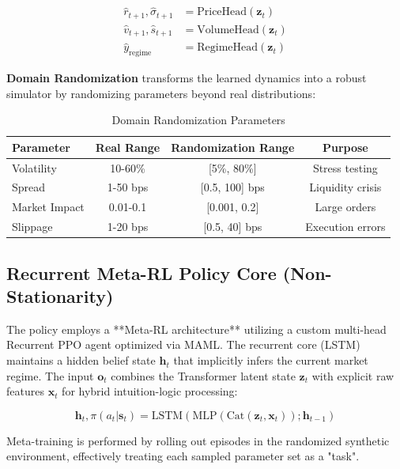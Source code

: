 \documentclass[11pt]{article}
\begin{document}
\begin{align}
    \hat{r}_{t+1}, \hat{\sigma}_{t+1} &= \text{PriceHead}(\mathbf{z}_t) \\
    \hat{v}_{t+1}, \hat{s}_{t+1} &= \text{VolumeHead}(\mathbf{z}_t) \\
    \hat{y}_{\text{regime}} &= \text{RegimeHead}(\mathbf{z}_t)
\end{align}

\textbf{Domain Randomization} transforms the learned dynamics into a robust simulator by randomizing parameters beyond real distributions:

\begin{table}[h]
\centering
\begin{tabular}{@{}lccc@{}}
\toprule
Parameter & Real Range & Randomization Range & Purpose \\
\midrule
Volatility & 10-60\% & [5\%, 80\%] & Stress testing \\
Spread & 1-50 bps & [0.5, 100] bps & Liquidity crisis \\
Market Impact & 0.01-0.1 & [0.001, 0.2] & Large orders \\
Slippage & 1-20 bps & [0.5, 40] bps & Execution errors \\
\bottomrule
\end{tabular}
\caption{Domain Randomization Parameters}
\label{tab:dr}
\end{table}

\subsection{Recurrent Meta-RL Policy Core (Non-Stationarity)}

The policy employs a **Meta-RL architecture** utilizing a custom multi-head Recurrent PPO agent optimized via MAML. The recurrent core (LSTM) maintains a hidden belief state $\mathbf{h}_t$ that implicitly infers the current market regime. The input $\mathbf{o}_t$ combines the Transformer latent state $\mathbf{z}_t$ with explicit raw features $\mathbf{x}_t$ for hybrid intuition-logic processing:

\begin{equation}
    \mathbf{h}_t, \pi(a_t|\mathbf{s}_t) = \text{LSTM}(\text{MLP}(\text{Cat}(\mathbf{z}_t, \mathbf{x}_t)); \mathbf{h}_{t-1})
\end{equation}

Meta-training is performed by rolling out episodes in the randomized synthetic environment, effectively treating each sampled parameter set as a "task".
\end{document}
